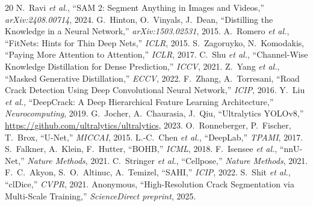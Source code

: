 \documentclass[12pt,a4paper]{article}
\newcommand{\etal}{\textit{et al.}}
\begin{document}

\begin{thebibliography}{20}
N.~Ravi \etal, ``SAM 2: Segment Anything in Images and Videos,''
\textit{arXiv:2408.00714}, 2024.
G.~Hinton, O.~Vinyals, J.~Dean, ``Distilling the Knowledge in a Neural
Network,'' \textit{arXiv:1503.02531}, 2015.
A.~Romero \etal, ``FitNets: Hints for Thin Deep Nets,'' \textit{ICLR}, 2015.
S.~Zagoruyko, N.~Komodakis, ``Paying More Attention to Attention,''
\textit{ICLR}, 2017.
C.~Shu \etal, ``Channel-Wise Knowledge Distillation for Dense Prediction,''
\textit{ICCV}, 2021.
Z.~Yang \etal, ``Masked Generative Distillation,'' \textit{ECCV}, 2022.
F.~Zhang, A.~Torresani, ``Road Crack Detection Using Deep Convolutional Neural
Network,'' \textit{ICIP}, 2016.
Y.~Liu \etal, ``DeepCrack: A Deep Hierarchical Feature Learning Architecture,''
\textit{Neurocomputing}, 2019.
G.~Jocher, A.~Chaurasia, J.~Qiu, ``Ultralytics YOLOv8,''
\url{https://github.com/ultralytics/ultralytics}, 2023.
O.~Ronneberger, P.~Fischer, T.~Brox, ``U-Net,'' \textit{MICCAI}, 2015.
L.-C.~Chen \etal, ``DeepLab,'' \textit{TPAMI}, 2017.
S.~Falkner, A.~Klein, F.~Hutter, ``BOHB,'' \textit{ICML}, 2018.
F.~Isensee \etal, ``nnU-Net,'' \textit{Nature Methods}, 2021.
C.~Stringer \etal, ``Cellpose,'' \textit{Nature Methods}, 2021.
F.~C.~Akyon, S.~O.~Altinuc, A.~Temizel, ``SAHI,'' \textit{ICIP}, 2022.
S.~Shit \etal, ``clDice,'' \textit{CVPR}, 2021.
Anonymous, ``High-Resolution Crack Segmentation via Multi-Scale Training,''
\textit{ScienceDirect preprint}, 2025.
\end{thebibliography}
\end{document}
